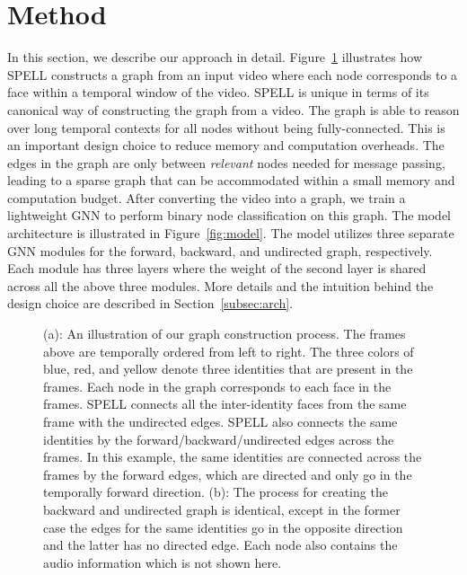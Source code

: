 \documentclass[runningheads]{llncs}
\begin{document}
\section{Method}
\label{sec:method}
\noindent
In this section, we describe our approach in detail. Figure~\ref{fig:graph_construction} illustrates how SPELL constructs a graph from an input video where each node corresponds to a face within a temporal window of the video. SPELL is unique in terms of its canonical way of constructing the graph from a video. The graph is able to reason over long temporal contexts for all nodes without being fully-connected. This is an important design choice to reduce memory and computation overheads. The edges in the graph are only between \emph{relevant} nodes needed for message passing, leading to a sparse graph that can be accommodated within a small memory and computation budget. 
After converting the video into a graph, 
we train a lightweight GNN to perform binary node classification on this graph. The model architecture is illustrated in Figure~\ref{fig:model}. The model utilizes three separate GNN modules for the forward, backward, and undirected graph, respectively. Each module has three layers where the weight of the second layer is shared across all the above three modules. More details and the intuition behind the design choice are described in Section~\ref{subsec:arch}. 





\begin{figure}[t]
  \adjustbox{valign=t}{\begin{minipage}[t]{0.75\linewidth}
  \small
    \texttt{[image: images/graph-a.png]}\-0.5ex] \hspace*{3.85em}(b)
  \end{minipage}}
  \caption{(a): An illustration of our graph construction process. The frames above are temporally ordered from left to right. The three colors of blue, red, and yellow denote three identities that are present in the frames. Each node in the graph corresponds to each face in the frames. SPELL connects all the inter-identity faces from the same frame with the undirected edges. SPELL also connects the same identities by the forward/backward/undirected edges across the frames. In this example, the same identities are connected across the frames by the forward edges, which are directed and only go in the temporally forward direction. (b): The process for creating the backward and undirected graph is identical, except in the former case the edges for the same identities go in the opposite direction and the latter has no directed edge. Each node also contains the audio information which is not shown here.}
  \label{fig:graph_construction}
\end{figure} 
\end{document}
